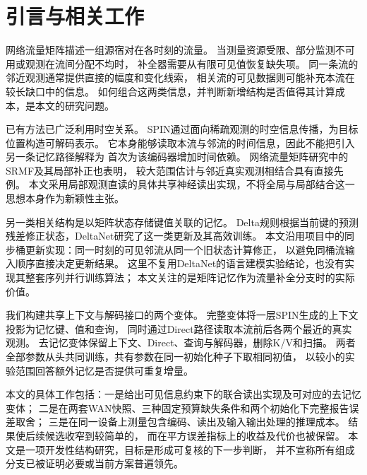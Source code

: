 \section{引言与相关工作}
网络流量矩阵描述一组源宿对在各时刻的流量。
当测量资源受限、部分监测不可用或观测在流间分配不均时，
补全器需要从有限可见值恢复缺失项。
同一条流的邻近观测通常提供直接的幅度和变化线索，
相关流的可见数据则可能补充本流在较长缺口中的信息。
如何组合这两类信息，并判断新增结构是否值得其计算成本，是本文的研究问题。

已有方法已广泛利用时空关系。
SPIN通过面向稀疏观测的时空信息传播，为目标位置构造可解码表示\cite{marisca2022spin}。
它本身能够读取本流与邻流的时间信息，因此不能把引入另一条记忆路径解释为
首次为该编码器增加时间依赖。
网络流量矩阵研究中的SRMF及其局部补正也表明，
较大范围估计与邻近真实观测相结合具有直接先例\cite{zhang2009srmf}。
本文采用局部观测直读的具体共享神经读出实现，不将全局与局部结合这一思想本身作为新颖性主张。

另一类相关结构是以矩阵状态存储键值关联的记忆。
Delta规则根据当前键的预测残差修正状态，DeltaNet研究了这一类更新及其高效训练\cite{yang2024deltanet}。
本文沿用项目中的同步桶更新实现：同一时刻的可见邻流从同一个旧状态计算修正，
以避免同桶流输入顺序直接决定更新结果。
这里不复用DeltaNet的语言建模实验结论，也没有实现其整套序列并行训练算法；
本文关注的是矩阵记忆作为流量补全分支时的实际价值。

我们构建共享上下文与解码接口的两个变体。
完整变体\full 将一层SPIN生成的上下文投影为记忆键、值和查询，
同时通过Direct路径读取本流前后各两个最近的真实观测。
去记忆变体\lite 保留上下文、Direct、查询与解码器，删除K/V和扫描。
两者全部参数从头共同训练，共有参数在同一初始化种子下取相同初值，
以较小的实验范围回答额外记忆是否提供可重复增量。

本文的具体工作包括：一是给出可见信息约束下的联合读出实现及可对应的去记忆变体；
二是在两套WAN快照、三种固定预算缺失条件和两个初始化下完整报告误差取舍；
三是在同一设备上测量包含编码、读出及输入输出处理的推理成本。
结果使后续候选收窄到较简单的\lite，
而\full 在平方误差指标上的收益及代价也被保留。
本文是一项开发性结构研究，目标是形成可复核的下一步判断，
并不宣称所有组成分支已被证明必要或当前方案普遍领先。
